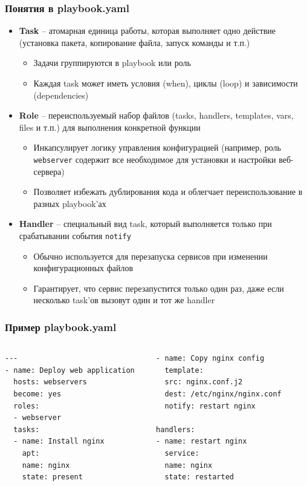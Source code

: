 \documentclass{beamer}
\begin{document}
\begin{frame}[fragile]
\frametitle{Понятия в playbook.yaml}

\begin{itemize}
  \item \textbf{Task} – атомарная единица работы, которая выполняет одно действие (установка пакета, копирование файла, запуск команды и т.п.)
  \begin{itemize}
    \item Задачи группируются в playbook или роль
    \item Каждая task может иметь условия (when), циклы (loop) и зависимости (dependencies)
  \end{itemize}
  
  \item \textbf{Role} – переиспользуемый набор файлов (tasks, handlers, templates, vars, files и т.п.) для выполнения конкретной функции
  \begin{itemize}
    \item Инкапсулирует логику управления конфигурацией (например, роль \texttt{webserver} содержит все необходимое для установки и настройки веб-сервера)
    \item Позволяет избежать дублирования кода и облегчает переиспользование в разных playbook'ах
  \end{itemize}
  
  \item \textbf{Handler} – специальный вид task, который выполняется только при срабатывании события \texttt{notify}
  \begin{itemize}
    \item Обычно используется для перезапуска сервисов при изменении конфигурационных файлов
    \item Гарантирует, что сервис перезапустится только один раз, даже если несколько task'ов вызовут один и тот же handler
  \end{itemize}
\end{itemize}

\end{frame}

\begin{frame}[fragile]
\frametitle{Пример playbook.yaml}


\begin{columns}[T]
\begin{verbatim}
---
- name: Deploy web application
  hosts: webservers
  become: yes
  roles:
  - webserver
  tasks:
  - name: Install nginx
    apt:
    name: nginx
    state: present
\end{verbatim}

\begin{verbatim}
  - name: Copy nginx config
    template:
    src: nginx.conf.j2
    dest: /etc/nginx/nginx.conf
    notify: restart nginx
    
  handlers:
  - name: restart nginx
    service:
    name: nginx
    state: restarted
\end{verbatim}
\end{columns}

\end{frame}
\end{document}
